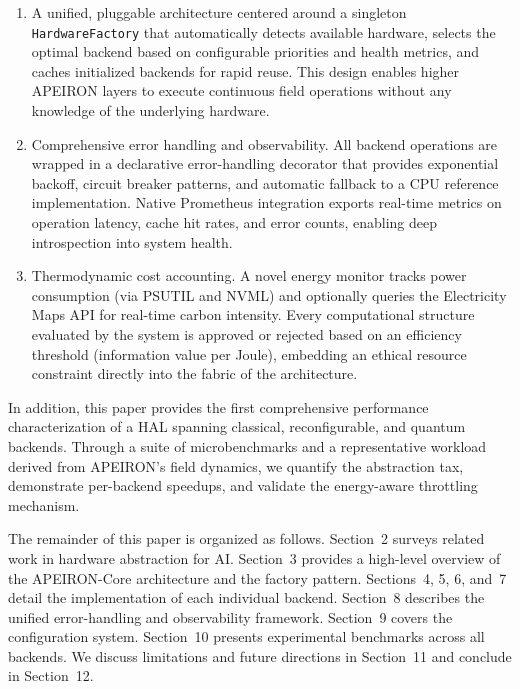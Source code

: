 \begin{enumerate}
    \item A unified, pluggable architecture centered around a singleton \texttt{HardwareFactory} that automatically detects available hardware, selects the optimal backend based on configurable priorities and health metrics, and caches initialized backends for rapid reuse. This design enables higher APEIRON layers to execute continuous field operations without any knowledge of the underlying hardware.
    \item Comprehensive error handling and observability. All backend operations are wrapped in a declarative error-handling decorator that provides exponential backoff, circuit breaker patterns, and automatic fallback to a CPU reference implementation. Native Prometheus integration exports real-time metrics on operation latency, cache hit rates, and error counts, enabling deep introspection into system health.
    \item Thermodynamic cost accounting. A novel energy monitor tracks power consumption (via PSUTIL and NVML) and optionally queries the Electricity Maps API for real-time carbon intensity. Every computational structure evaluated by the system is approved or rejected based on an efficiency threshold (information value per Joule), embedding an ethical resource constraint directly into the fabric of the architecture.
\end{enumerate}

In addition, this paper provides the first comprehensive performance characterization of a HAL spanning classical, reconfigurable, and quantum backends. Through a suite of microbenchmarks and a representative workload derived from APEIRON's field dynamics, we quantify the abstraction tax, demonstrate per-backend speedups, and validate the energy-aware throttling mechanism.

The remainder of this paper is organized as follows. Section~2 surveys related work in hardware abstraction for AI. Section~3 provides a high-level overview of the APEIRON-Core architecture and the factory pattern. Sections~4, 5, 6, and~7 detail the implementation of each individual backend. Section~8 describes the unified error-handling and observability framework. Section~9 covers the configuration system. Section~10 presents experimental benchmarks across all backends. We discuss limitations and future directions in Section~11 and conclude in Section~12.